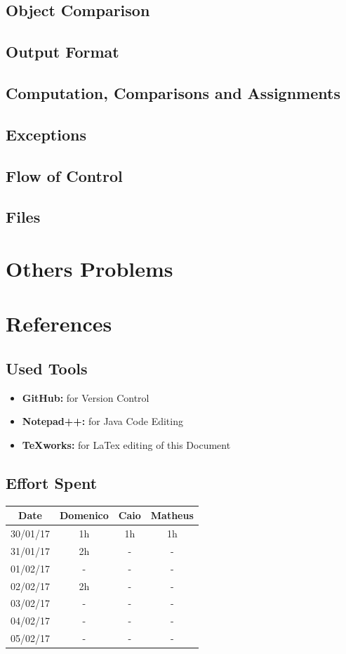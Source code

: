 \documentclass[a4paper]{article}
\begin{document}
\subsection{Object Comparison}
\subsection{Output Format}
\subsection{Computation, Comparisons and Assignments}
\subsection{Exceptions}
\subsection{Flow of Control}
\subsection{Files}

\section{Others Problems}

\newpage
\section{References}
\subsection{Used Tools}
\begin{itemize}
	\item \textbf{GitHub:} for Version Control
	\item \textbf {Notepad++:} for Java Code Editing
	\item \textbf {TeXworks:} for LaTex editing of this Document
\end{itemize}

\newpage
\subsection{Effort Spent}
\begin{tabular}{ | c | c | c | c | }
\hline
	\textbf {Date} & \textbf {Domenico} & \textbf {Caio} & \textbf {Matheus} \\ \hline
	30/01/17& 1h & 1h & 1h  \\ \hline
	31/01/17& 2h & - & -  \\ \hline
	01/02/17& - & - & -  \\ \hline
	02/02/17& 2h & - & -  \\ \hline
	03/02/17& - & - & -  \\ \hline
	04/02/17& - & - & -  \\ \hline
	05/02/17& - & - & -  \\ \hline

\end{tabular}
\newpage
\end{document}
